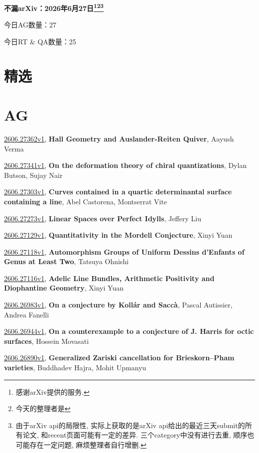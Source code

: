 \documentclass[9pt, a4paper]{article}
\theoremstyle{plain}
\theoremstyle{definition}
\theoremstyle{remark}
\newcommand{\arxiv}[3]{\href{https://arxiv.org/abs/#1}{#1}, \textbf{\textcolor{arxivblue}{#2}}, #3}
\newcommand{\AGnumber}{27}
\newcommand{\RTQAnumber}{25}
\newcommand{\NewestDate}{2026年6月27日}
\newcommand{\todayarXiver}{} %
\begin{document}
\begin{center}
    \Huge\textbf{不漏arXiv：\NewestDate\footnote{感谢arXiv提供的服务.}\footnote{今天的整理者是\todayarXiver}\footnote{由于arXiv api的局限性, 实际上获取的是arXiv api给出的最近三天submit的所有论文, 和recent页面可能有一定的差异. 三个category中没有进行去重, 顺序也可能存在一定问题, 麻烦整理者自行增删.}} \\
\end{center}

\setcounter{section}{-1}

\begin{center}
    今日AG数量：\AGnumber
    
    今日RT \& QA数量：\RTQAnumber
    
\end{center}


\section{精选}


\section{AG}
\arxiv{2606.27362v1}{Hall Geometry and Auslander-Reiten Quiver}{Aayush Verma}

\arxiv{2606.27341v1}{On the deformation theory of chiral quantizations}{Dylan Butson, Sujay Nair}

\arxiv{2606.27303v1}{Curves contained in a quartic determinantal surface containing a line}{Abel Castorena, Montserrat Vite}

\arxiv{2606.27273v1}{Linear Spaces over Perfect Idylls}{Jeffery Liu}

\arxiv{2606.27129v1}{Quantitativity in the Mordell Conjecture}{Xinyi Yuan}

\arxiv{2606.27118v1}{Automorphism Groups of Uniform Dessins d'Enfants of Genus at Least Two}{Tatsuya Ohnishi}

\arxiv{2606.27116v1}{Adelic Line Bundles, Arithmetic Positivity and Diophantine Geometry}{Xinyi Yuan}

\arxiv{2606.26983v1}{On a conjecture by Kollár and Saccà}{Pascal Autissier, Andrea Fanelli}

\arxiv{2606.26944v1}{On a counterexample to a conjecture of J. Harris for octic surfaces}{Hossein Movasati}

\arxiv{2606.26890v1}{Generalized Zariski cancellation for Brieskorn--Pham varieties}{Buddhadev Hajra, Mohit Upmanyu}
\end{document}
